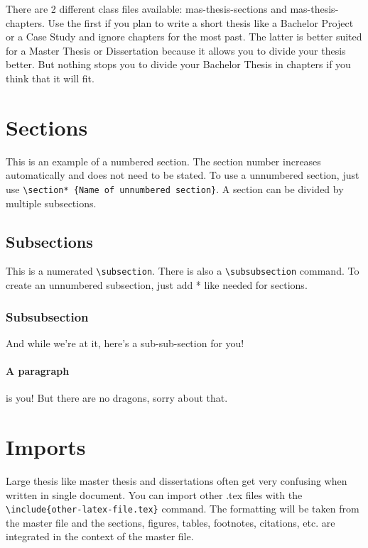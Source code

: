 \documentclass[seminarpaper, grey, english]{mas-thesis-sections}   %
\begin{document}
There are 2 different class files available: mas-thesis-sections and mas-thesis-chapters. Use the first if you plan to write a short thesis like a Bachelor Project or a Case Study and ignore chapters for the most past. The latter is better suited for a Master Thesis or Dissertation because it allows you to divide your thesis better. But nothing stops you to divide your Bachelor Thesis in chapters if you think that it will fit.



\section{Sections}

This is an example of a numbered section. The section number increases automatically and does not need to be stated. To use a unnumbered section, just use \texttt{\textbackslash section* \{Name of unnumbered section\}}. A section can be divided by multiple subsections.

\subsection{Subsections}

This is a numerated \texttt{\textbackslash subsection}. There is also a \texttt{\textbackslash subsubsection} command. To create an unnumbered subsection, just add * like needed for sections.

\subsubsection{Subsubsection}

And while we're at it, here's a sub-sub-section for you!

\paragraph{A paragraph} is you! But there are no dragons, sorry about that.



\section{Imports}

Large thesis like master thesis and dissertations often get very confusing when written in single document. You can import other .tex files with the\\\texttt{\textbackslash include\{other-latex-file.tex\}} command. The formatting will be taken from the master file and the sections, figures, tables, footnotes, citations, etc. are integrated in the context of the master file.
\end{document}
